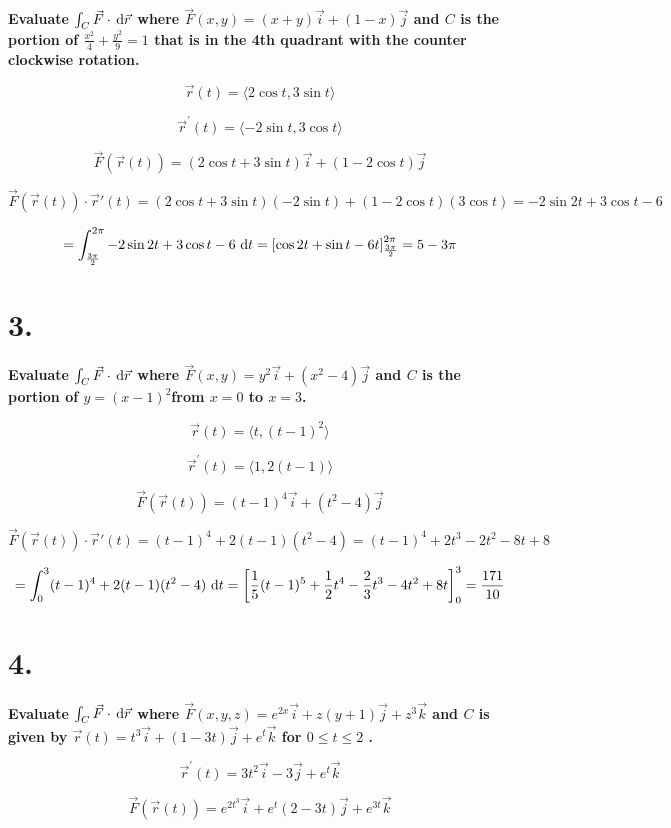 \documentclass{scrartcl}
\DeclareRobustCommand*\d
{\ifmmode\mathop{}\!\mathrm{d}\else\expandafter\originald\fi}
\begin{document}
\textbf{Evaluate $\int_{C}^{} \vec{F} \cdot \, \d \vec{r}$ where $\vec{F}(x,y)=(x+y)\vec{i}+(1-x)\vec{j}$ and $C$ is the portion	of $\frac{x^2}{4}+\frac{y^2}{9}=1$ that is in the 4th quadrant with the counter clockwise rotation.}

\[\vec{r}(t)=\langle 2\cos{t},3\sin{t}\rangle\]

\[\vec{r}^{\prime}(t)=\langle -2\sin{t},3\cos{t}\rangle\]

\[\vec{F}(\vec{r}(t))= (2\cos{t}+3\sin{t})\vec{i}+(1-2\cos{t})\vec{j}\]

\[\vec{F}(\vec{r}(t))\cdot \vec{r}{\prime}(t) =(2\cos{t}+3\sin{t})(-2\sin{t}) + (1-2\cos{t})(3\cos{t})=-2\sin{2t}+3\cos{t}-6\]

\[=\int_{\frac{3\pi}{2}}^{2\pi} -2\sin{2t}+3\cos{t}-6 \, \d t =\left[\cos{2t}+\sin{t}-6t\right]_{\frac{3\pi}{2}}^{2\pi} = 5 - 3\pi\]

\section*{3.}

\textbf{Evaluate $\int_{C}^{} \vec{F} \cdot \, \d \vec{r}$ where $\vec{F}(x,y)=y^2\vec{i}+(x^2-4)\vec{j}$ and $C$ is the portion	of $y=(x-1)^2$from $x=0$ to $x=3$.}

\[\vec{r}(t)=\langle t,(t-1)^2\rangle\]

\[\vec{r}^{\prime}(t)=\langle 1,2(t-1)\rangle\]

\[\vec{F}(\vec{r}(t))= (t-1)^4\vec{i}+(t^2-4)\vec{j}\]

\[\vec{F}(\vec{r}(t))\cdot \vec{r}{\prime}(t) =(t-1)^4 + 2(t-1)(t^2-4)=(t-1)^4 + 2t^3-2t^2-8t+8\]

\[=\int_{0}^{3} (t-1)^4 + 2(t-1)(t^2-4) \, \d t =\left[\frac{1}{5}(t-1)^5 + \frac{1}{2}t^4-\frac{2}{3}t^3-4t^2+8t\right]_{0}^{3} = \frac{171}{10}\]

\section*{4.}

\textbf{Evaluate $\int_{C}^{} \vec{F} \cdot \, \d \vec{r}$ where $\vec{F}(x,y,z)=e^{2x}\vec{i}+z(y+1)\vec{j}+z^3\vec{k}$ and $C$ is given by $\vec{r}(t)=t^3\vec{i}+(1-3t)\vec{j}+e^{t}\vec{k}$ for $0 \leq t \leq 2$	.}

\[\vec{r}^{\prime}(t)= 3t^2\vec{i}-3\vec{j}+e^t\vec{k}\]

\[\vec{F}(\vec{r}(t))= e^{2t^{3}}\vec{i}+e^{t}(2-3t)\vec{j}+e^{3t}\vec{k}\]
\end{document}
